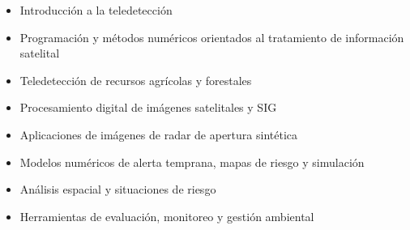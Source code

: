 \begin{itemize}
\item {Introducción a la teledetección}
\item {Programación y métodos numéricos orientados al tratamiento de información satelital}
\item {Teledetección de recursos agrícolas y forestales}
\item {Procesamiento digital de imágenes satelitales y SIG}
\item {Aplicaciones de imágenes de radar de apertura sintética}
\item {Modelos numéricos de alerta temprana, mapas de riesgo y simulación}
\item {Análisis espacial y situaciones de riesgo}
\item {Herramientas de evaluación, monitoreo y gestión ambiental}
\end{itemize}